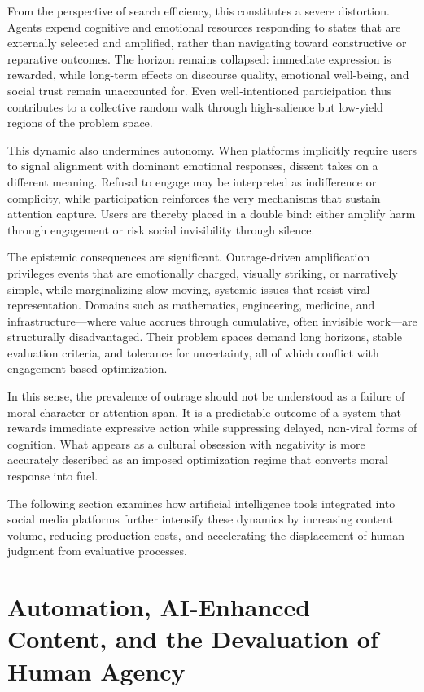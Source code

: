 \documentclass[12pt]{article}
\begin{document}
From the perspective of search efficiency, this constitutes a severe distortion. Agents expend cognitive and emotional resources responding to states that are externally selected and amplified, rather than navigating toward constructive or reparative outcomes. The horizon remains collapsed: immediate expression is rewarded, while long-term effects on discourse quality, emotional well-being, and social trust remain unaccounted for. Even well-intentioned participation thus contributes to a collective random walk through high-salience but low-yield regions of the problem space.

This dynamic also undermines autonomy. When platforms implicitly require users to signal alignment with dominant emotional responses, dissent takes on a different meaning. Refusal to engage may be interpreted as indifference or complicity, while participation reinforces the very mechanisms that sustain attention capture. Users are thereby placed in a double bind: either amplify harm through engagement or risk social invisibility through silence.

The epistemic consequences are significant. Outrage-driven amplification privileges events that are emotionally charged, visually striking, or narratively simple, while marginalizing slow-moving, systemic issues that resist viral representation. Domains such as mathematics, engineering, medicine, and infrastructure—where value accrues through cumulative, often invisible work—are structurally disadvantaged. Their problem spaces demand long horizons, stable evaluation criteria, and tolerance for uncertainty, all of which conflict with engagement-based optimization.

In this sense, the prevalence of outrage should not be understood as a failure of moral character or attention span. It is a predictable outcome of a system that rewards immediate expressive action while suppressing delayed, non-viral forms of cognition. What appears as a cultural obsession with negativity is more accurately described as an imposed optimization regime that converts moral response into fuel.

The following section examines how artificial intelligence tools integrated into social media platforms further intensify these dynamics by increasing content volume, reducing production costs, and accelerating the displacement of human judgment from evaluative processes.

\section{Automation, AI-Enhanced Content, and the Devaluation of Human Agency}
\end{document}
